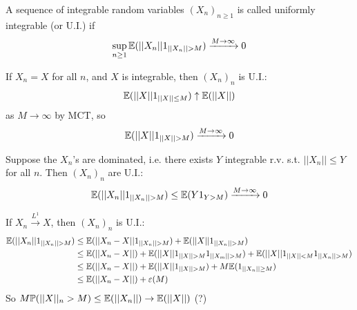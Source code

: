 \documentclass[a4paper]{article}
\begin{document}
\begin{defi}
A sequence of integrable random variables $(X_n)_{n \geq 1}$ is called uniformly integrable (or U.I.) if
\begin{equation*}
\begin{aligned}
\sup_{n \geq 1} \E(||X_n|| 1_{||X_n||>M}) \xrightarrow{M \to \infty} 0
\end{aligned}
\end{equation*}
\end{defi}

\begin{rem}
If $X_n = X$ for all $n$, and $X$ is integrable, then $(X_n)_n$ is U.I.:
\begin{equation*}
\begin{aligned}
\mathbb{E}(||X||1_{||X||\leq M}) \uparrow \mathbb{E}(||X||)
\end{aligned}
\end{equation*}
as $M \to \infty$ by MCT, so
\begin{equation*}
\begin{aligned}
\E(||X|| 1_{||X||> M}) \xrightarrow{M \to \infty} 0
\end{aligned}
\end{equation*}
\end{rem}

Suppose the $X_n$'s are dominated, i.e. there exists $Y$ integrable r.v. s.t. $||X_n||\leq Y$ for all $n$. Then $(X_n)_n$ are U.I.:
\begin{equation*}
\begin{aligned}
\mathbb{E}(||X_n|| 1_{||X_n|| > M}) \leq \mathbb{E}(Y 1_{Y>M}) \xrightarrow{M \to \infty} 0
\end{aligned}
\end{equation*}

If $X_n \xrightarrow{L^1} X$, then $(X_n)_n$ is U.I.:
\begin{equation*}
\begin{aligned}
\E(||X_n||1_{||X_n||>M}) &\leq \E(||X_n-X|| 1_{||X_n||>M}) + \E(||X|| 1_{||X_n||>M})\\
&\leq \E(||X_n-X||) + \E(||X||1_{||X||>M} 1_{||X_m||>M}) + \E(||X|| 1_{||X|| < M} 1_{||X_n||>M})\\
&\leq \E(||X_n-X||) + \E(||X|| 1_{||X||>M}) + M\E(1_{||X_n|| \geq M})\\
&\leq \E(||X_n-X||) + \varepsilon(M)
\end{aligned}
\end{equation*}
So $M \mathbb{P}(||X||_n > M) \leq \mathbb{E}(||X_n||) \to \mathbb{E}(||X||)$ (?)
\end{document}
